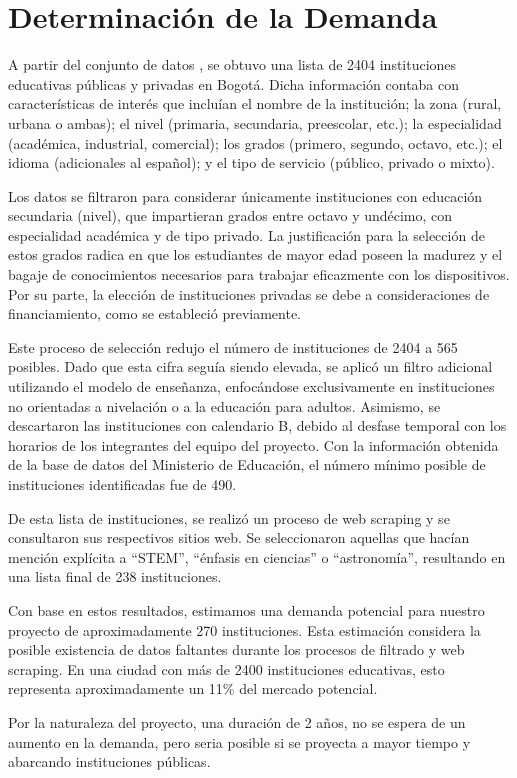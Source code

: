 \section{Determinación de la Demanda}%
\label{sec:Determinación de la Demanda}

A partir del conjunto de datos \cite{Nacional2016}, se obtuvo una lista de 2404
instituciones educativas públicas y privadas en Bogotá.
Dicha información contaba con características de interés que incluían el nombre
de la institución; la zona (rural, urbana o ambas);
el nivel (primaria, secundaria, preescolar, etc.); la especialidad
(académica, industrial, comercial); los grados (primero, segundo, octavo,
etc.); el idioma (adicionales al español); y el tipo de servicio (público,
privado o mixto).

Los datos se filtraron para considerar únicamente instituciones con educación
secundaria (nivel), que impartieran grados entre octavo y undécimo, con
especialidad académica y de tipo privado.
La justificación para la selección de estos grados radica en que los
estudiantes de mayor edad poseen la madurez y el bagaje de conocimientos
necesarios para trabajar eficazmente con los dispositivos.
Por su parte, la elección de instituciones privadas se debe a consideraciones
de financiamiento, como se estableció previamente.

Este proceso de selección redujo el número de instituciones de 2404 a 565
posibles.
Dado que esta cifra seguía siendo elevada, se aplicó un filtro adicional
utilizando el modelo de enseñanza, enfocándose exclusivamente en instituciones
no orientadas a nivelación o a la educación para adultos.
Asimismo, se descartaron las instituciones con calendario B, debido al desfase
temporal con los horarios de los integrantes del equipo del proyecto.
Con la información obtenida de la base de datos del Ministerio de Educación,
el número mínimo posible de instituciones identificadas fue de 490.

De esta lista de instituciones, se realizó un proceso de web scraping y se
consultaron sus respectivos sitios web.
Se seleccionaron aquellas que hacían mención explícita a ``STEM'', ``énfasis en
ciencias'' o ``astronomía'', resultando en una lista final de 238 instituciones.

Con base en estos resultados, estimamos una demanda potencial para nuestro
proyecto de aproximadamente 270 instituciones.
Esta estimación considera la posible existencia de datos faltantes durante los
procesos de filtrado y web scraping.
En una ciudad con más de 2400 instituciones educativas, esto representa
aproximadamente un 11\% del mercado potencial.

Por la naturaleza del proyecto, una duración de 2 años, no se espera de un
aumento en la demanda, pero seria posible si se proyecta a mayor tiempo
y abarcando instituciones públicas.
